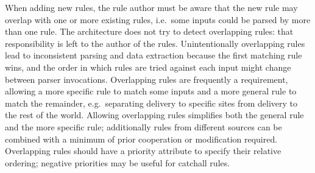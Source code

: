 When adding new rules, the rule author must be aware that the new rule may
overlap with one or more existing rules, i.e.\ some inputs could be parsed
by more than one rule.  The architecture does not try to detect overlapping
rules: that responsibility is left to the author of the rules.
Unintentionally overlapping rules lead to inconsistent parsing and data
extraction because the first matching rule wins, and the order in which
rules are tried against each input might change between parser invocations.
Overlapping rules are frequently a requirement, allowing a more specific
rule to match some inputs and a more general rule to match the remainder,
e.g.\ separating  delivery to specific sites from
 delivery to the rest of the world.  Allowing overlapping
rules simplifies both the general rule and the more specific rule;
additionally rules from different sources can be combined with a minimum of
prior cooperation or modification required.  Overlapping rules should have
a priority attribute to specify their relative ordering; negative
priorities may be useful for catchall rules.

